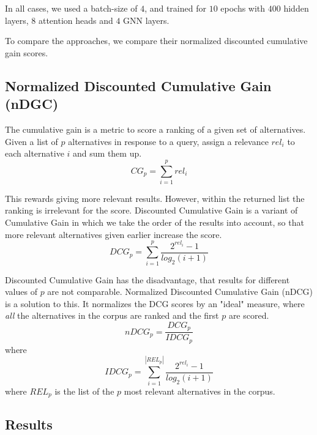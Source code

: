 In all cases, we used a batch-size of $4$, and trained for $10$ epochs with $400$ hidden layers, $8$ attention heads and $4$ GNN layers.

To compare the approaches, we compare their normalized discounted cumulative gain scores.

\subsection{Normalized Discounted Cumulative Gain (nDGC)} 
The cumulative gain is a metric to score a ranking of a given set of alternatives. Given a list of \(p\) alternatives in response to a query, assign a relevance \(rel_i\) to each alternative \(i\) and sum them up.
\[ CG_p = \sum_{i=1}^{p} rel_i \]

This rewards giving more relevant results. However, within the returned list the ranking is irrelevant for the score.
% 
Discounted Cumulative Gain is a variant of Cumulative Gain in which we take the order of the results into account, so that more relevant alternatives given earlier increase the score.
\[ DCG_p = \sum_{i=1}^{p} \frac{2^{rel_i} - 1}{log_2 (i+1)} \]


Discounted Cumulative Gain has the disadvantage, that results for different values of \(p\) are not comparable.
% 
Normalized Discounted Cumulative Gain (nDCG) is a solution to this\cite{jarvelin_cumulated_2002}.
It normalizes the DCG scores by an "ideal" measure, where \emph{all} the alternatives in the corpus are ranked and the first \(p\) are scored.
\[ nDCG_p = \frac{DCG_p}{IDCG_p} \]
where
\[ IDCG_p = \sum_{i=1}^{|REL_p|} \frac{2^{rel_i} - 1}{log_2 (i+1)} \]
where \(REL_p\) is the list of the \(p\) most relevant alternatives in the corpus.



\subsection{Results}

